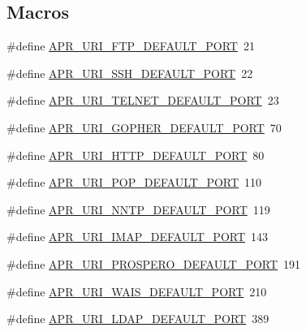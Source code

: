 \subsection*{Macros}
\begin{DoxyCompactItemize}
\item 
\#define \hyperlink{group__APR__Util__URI_ga0134a6dcaf62796e014c592ac4b2c09c}{A\+P\+R\+\_\+\+U\+R\+I\+\_\+\+F\+T\+P\+\_\+\+D\+E\+F\+A\+U\+L\+T\+\_\+\+P\+O\+RT}~21
\item 
\#define \hyperlink{group__APR__Util__URI_ga4f4161d54207cf302b3c91cdda428be1}{A\+P\+R\+\_\+\+U\+R\+I\+\_\+\+S\+S\+H\+\_\+\+D\+E\+F\+A\+U\+L\+T\+\_\+\+P\+O\+RT}~22
\item 
\#define \hyperlink{group__APR__Util__URI_ga0b6bcdfb9754edd6c160c9d6755df085}{A\+P\+R\+\_\+\+U\+R\+I\+\_\+\+T\+E\+L\+N\+E\+T\+\_\+\+D\+E\+F\+A\+U\+L\+T\+\_\+\+P\+O\+RT}~23
\item 
\#define \hyperlink{group__APR__Util__URI_gaaf5bb1e53b22fa7ac4e88f415e7c2476}{A\+P\+R\+\_\+\+U\+R\+I\+\_\+\+G\+O\+P\+H\+E\+R\+\_\+\+D\+E\+F\+A\+U\+L\+T\+\_\+\+P\+O\+RT}~70
\item 
\#define \hyperlink{group__APR__Util__URI_ga7a9fa7be10430864617b3a0a58dd5d12}{A\+P\+R\+\_\+\+U\+R\+I\+\_\+\+H\+T\+T\+P\+\_\+\+D\+E\+F\+A\+U\+L\+T\+\_\+\+P\+O\+RT}~80
\item 
\#define \hyperlink{group__APR__Util__URI_gaf9408c6288a8580b285d7af58f836856}{A\+P\+R\+\_\+\+U\+R\+I\+\_\+\+P\+O\+P\+\_\+\+D\+E\+F\+A\+U\+L\+T\+\_\+\+P\+O\+RT}~110
\item 
\#define \hyperlink{group__APR__Util__URI_ga86ac4da6cabda295f87042fb258fc36b}{A\+P\+R\+\_\+\+U\+R\+I\+\_\+\+N\+N\+T\+P\+\_\+\+D\+E\+F\+A\+U\+L\+T\+\_\+\+P\+O\+RT}~119
\item 
\#define \hyperlink{group__APR__Util__URI_ga6e8aade3786adb75dc63b9d0bd3bfbb9}{A\+P\+R\+\_\+\+U\+R\+I\+\_\+\+I\+M\+A\+P\+\_\+\+D\+E\+F\+A\+U\+L\+T\+\_\+\+P\+O\+RT}~143
\item 
\#define \hyperlink{group__APR__Util__URI_ga329c26e04dd9449fd565f8ba76e8666c}{A\+P\+R\+\_\+\+U\+R\+I\+\_\+\+P\+R\+O\+S\+P\+E\+R\+O\+\_\+\+D\+E\+F\+A\+U\+L\+T\+\_\+\+P\+O\+RT}~191
\item 
\#define \hyperlink{group__APR__Util__URI_ga0807570c6ef5c3813f65915fb0c19ff2}{A\+P\+R\+\_\+\+U\+R\+I\+\_\+\+W\+A\+I\+S\+\_\+\+D\+E\+F\+A\+U\+L\+T\+\_\+\+P\+O\+RT}~210
\item 
\#define \hyperlink{group__APR__Util__URI_ga5c648234ed92d19a09232080779a0185}{A\+P\+R\+\_\+\+U\+R\+I\+\_\+\+L\+D\+A\+P\+\_\+\+D\+E\+F\+A\+U\+L\+T\+\_\+\+P\+O\+RT}~389

\end{DoxyCompactItemize}
